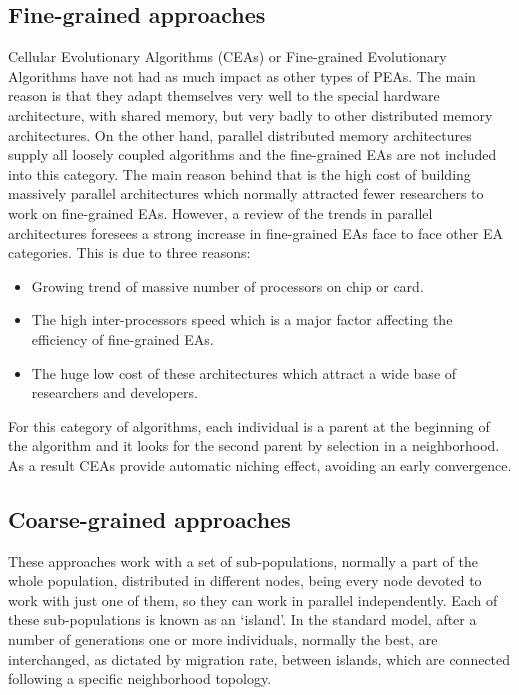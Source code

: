 \documentclass{article}
\begin{document}
\subsection{Fine-grained approaches}
\label{subsec:finegrainedapproaches}

Cellular Evolutionary Algorithms (CEAs) or Fine-grained Evolutionary
Algorithms have not had as much impact as other types of PEAs. The
main reason is that they adapt themselves very well to the special
hardware architecture, with shared memory, but very badly to other
distributed memory architectures. On the other hand, parallel
distributed memory architectures supply all loosely coupled algorithms
and the fine-grained EAs are not included into this category. The main
reason behind that is the high cost of building massively parallel
architectures which normally attracted fewer researchers to work on
fine-grained EAs. However, a review of the trends in parallel
architectures foresees a strong increase in fine-grained EAs face to
face other EA categories. This is due to three reasons:  

\begin{itemize}
\item Growing trend of massive number of processors on chip or card. 
\item The high inter-processors speed which is a major factor affecting the efficiency of fine-grained EAs. 
\item The huge low cost of these architectures which attract a wide base of researchers and developers. 
\end{itemize}

For this category of algorithms, each individual is a parent at the beginning of the algorithm and it looks for the second parent by selection in a neighborhood. As a result CEAs provide automatic niching effect, avoiding an early convergence. 

\subsection{Coarse-grained approaches}
\label{subsec:coarsegrainedapproaches}

These approaches work with a set of sub-populations, normally a part
of the whole population, distributed in different nodes, being every
node devoted to work with just one of them, so they can work in
parallel independently. Each of these sub-populations is known as an
`island'. In the standard model, after a number of generations one or
more individuals, normally the best, are interchanged, as dictated by
migration rate, between islands, which are connected following a
specific neighborhood topology. 
\end{document}
